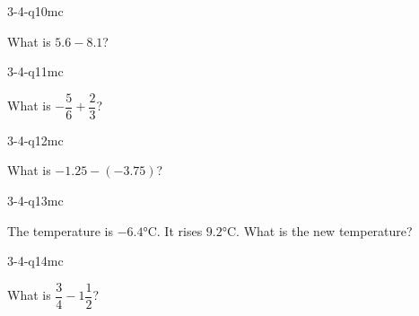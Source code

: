 \begin{practiceQuestion}{3-4-q10}{mc}
\begin{questionText}
What is $5.6 - 8.1$?
\end{questionText}
\end{practiceQuestion}

\begin{practiceQuestion}{3-4-q11}{mc}
\begin{questionText}
What is $-\dfrac{5}{6} + \dfrac{2}{3}$?
\end{questionText}
\end{practiceQuestion}

\begin{practiceQuestion}{3-4-q12}{mc}
\begin{questionText}
What is $-1.25 - (-3.75)$?
\end{questionText}
\end{practiceQuestion}

\begin{practiceQuestion}{3-4-q13}{mc}
\begin{questionText}
The temperature is $-6.4°$C. It rises $9.2°$C. What is the new temperature?
\end{questionText}
\end{practiceQuestion}

\begin{practiceQuestion}{3-4-q14}{mc}
\begin{questionText}
What is $\dfrac{3}{4} - 1\dfrac{1}{2}$?
\end{questionText}
\end{practiceQuestion}

